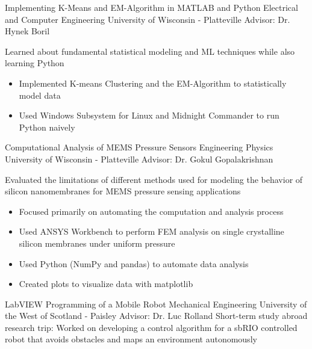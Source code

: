 {Implementing K-Means and EM-Algorithm in MATLAB and Python}
{Electrical and Computer Engineering}
{University of Wisconsin - Platteville}
{Advisor: Dr. Hynek Boril}
{Learned about fundamental statistical modeling and ML techniques while also learning Python
\begin{itemize}
    \item Implemented K-means Clustering and the EM-Algorithm to statistically model data
    \item Used Windows Subsystem for Linux and Midnight Commander to run Python naively
\end{itemize}
}

{Computational Analysis of MEMS Pressure Sensors}
{Engineering Physics}
{University of Wisconsin - Platteville}
{Advisor: Dr. Gokul Gopalakrishnan}
{Evaluated the limitations of different methods used for modeling the behavior of silicon nanomembranes for MEMS pressure sensing applications
\begin{itemize}
    \item Focused primarily on automating the computation and analysis process
    \item Used ANSYS Workbench to perform FEM analysis on single crystalline silicon membranes under uniform pressure
    \item Used Python (NumPy and pandas) to automate data analysis
    \item Created plots to visualize data with matplotlib
\end{itemize}
}

{LabVIEW Programming of a Mobile Robot}
{Mechanical Engineering}
{University of the West of Scotland - Paisley}
{Advisor: Dr. Luc Rolland}
{Short-term study abroad research trip: Worked on developing a control algorithm for a sbRIO controlled robot that avoids obstacles and maps an environment autonomously}